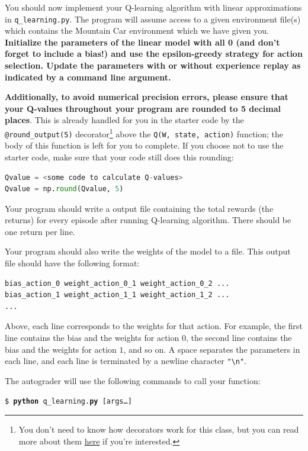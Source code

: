 \documentclass[11pt,addpoints,answers]{exam}
\begin{document}
You should now implement your Q-learning algorithm with linear approximations in \texttt{q\_learning.py}. The program will assume access to a given environment file(s) which contains the Mountain Car environment which we have given you.  \textbf{Initialize the parameters of the linear model with all 0 (and don't forget to include a bias!) and use the epsilon-greedy strategy for action selection. Update the parameters with or without experience replay as indicated by a command line argument.}

\textbf{Additionally, to avoid numerical precision errors, please ensure that your Q-values throughout your program are rounded to 5 decimal places}. This is already handled for you in the starter code by the \texttt{@round\_output(5)} decorator\footnote{You don't need to know how decorators work for this class, but you can read more about them \href{https://realpython.com/primer-on-python-decorators/}{here} if you're interested.} above the \texttt{Q(W, state, action)} function; the body of this function is left for you to complete. If you choose not to use the starter code, make sure that your code still does this rounding:
\begin{lstlisting}[language=Python]
Qvalue = <some code to calculate Q-values>
Qvalue = np.round(Qvalue, 5)
\end{lstlisting}

Your program should write a output file containing the total rewards (the returns) for every episode after running Q-learning algorithm. There should be one return per line.

Your program should also write the weights of the model to a file. This output file should have the following format:
\begin{lstlisting}
bias_action_0 weight_action_0_1 weight_action_0_2 ...
bias_action_1 weight_action_1_1 weight_action_1_2 ...
...
\end{lstlisting}

Above, each line corresponds to the weights for that action. For example, the first line contains the bias and the weights for action $0$, the second line contains the bias and the weights for action $1$, and so on. A space separates the parameters in each line, and each line is terminated by a newline character \texttt{"\textbackslash n"}.

The autograder will use the following commands to call your function:

\begin{tabbing}
\=\texttt{\$ \textbf{python} q\_learning.\textbf{py} [args\dots]}
\end{tabbing}
\end{document}

